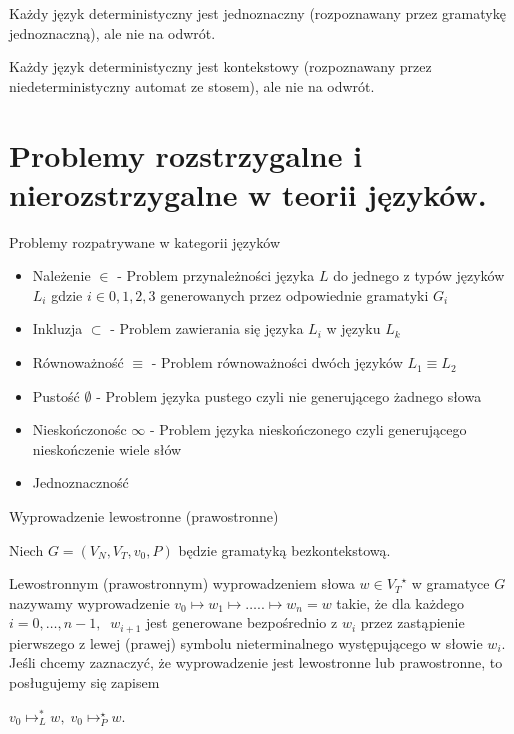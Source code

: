 \documentclass[12pt]{article}
\begin{document}
    \begin{theorem}
        Każdy język deterministyczny jest jednoznaczny (rozpoznawany przez gramatykę jednoznaczną), ale nie na odwrót.
    \end{theorem}

    \begin{theorem}
        Każdy język deterministyczny jest kontekstowy (rozpoznawany przez niedeterministyczny automat ze stosem), ale nie na odwrót.
    \end{theorem}

    \newpage

    \section{Problemy rozstrzygalne i nierozstrzygalne w teorii języków.}

    Problemy rozpatrywane w kategorii języków
    \begin{itemize}
        \item Należenie $\in$ - Problem przynależności języka $L$ do jednego z typów języków $L_i$ gdzie $i \in {0,1,2,3}$ generowanych przez odpowiednie gramatyki  $G_i$
        \item Inkluzja $\subset$ - Problem zawierania się języka $L_i$ w języku $L_k$
        \item Równoważność $\equiv$ - Problem równoważności dwóch języków $L_1 \equiv L_2$
        \item Pustość $\emptyset$ - Problem języka pustego czyli nie generującego żadnego słowa
        \item Nieskończonośc $\infty$ - Problem języka nieskończonego czyli generującego nieskończenie wiele słów
        \item Jednoznaczność
    \end{itemize}

    \begin{definition}
        Wyprowadzenie lewostronne (prawostronne)

        Niech $G = (V_N,V_T,v_0,P)$ będzie gramatyką bezkontekstową.

        Lewostronnym (prawostronnym) wyprowadzeniem słowa $w \in {V_T}^\star$ w gramatyce $G$ nazywamy wyprowadzenie
        $v_0 \mapsto w_1 \mapsto \ldots.. \mapsto w_n = w$
        takie, że dla każdego $i=0,\ldots,n-1, \;\; w_{i+1}$ jest generowane bezpośrednio z $w_i$ przez zastąpienie pierwszego z lewej (prawej) symbolu nieterminalnego występującego w słowie $w_i$.
        Jeśli chcemy zaznaczyć, że wyprowadzenie jest lewostronne lub prawostronne, to posługujemy się zapisem

        $v_{0}\mapsto_{L}^{*}w,\; v_{0}\mapsto_{P}^{\star}w$.
    \end{definition}
\end{document}
